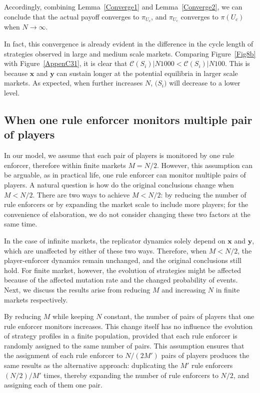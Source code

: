 \documentclass[letterpaper,10pt]{article}
\numberwithin{equation}{section}
\begin{document}
Accordingly, combining Lemma~\ref{Converge1} and Lemma~\ref{Converge2}, we can conclude that the actual payoff converges to $ \pi_{U_{c}} $, and $ \pi_{U_{c}} $ converges to $ \pi(U_c) $ when $ N\to \infty $.

In fact, this convergence is already evident in the difference in the cycle length of strategies observed in large and medium scale markets. Comparing Figure~\ref{Fig8b} with Figure~\ref{AppenC31}, it is clear that $ \mathscr{C}(S_{i})|N1000 < \mathscr{C}(S_{i})|N100 $. This is because $ \mathbf{x} $ and $ \mathbf{y} $ can sustain longer at the potential equilibria in larger scale markets. As expected, when further increases $ N $, $ \mathscr(S_{i}) $ will decrease to a lower level.

\pagebreak
\subsection{When one rule enforcer monitors multiple pair of players}\label{AppendixC7}

In our model, we assume that each pair of players is monitored by one rule enforcer, therefore within finite markets $ M = N/2 $. However, this assumption can be arguable, as in practical life, one rule enforcer can monitor multiple pairs of players. A natural question is how do the original conclusions change when $ M < N/2 $. There are two ways to achieve $ M < N/2 $: by reducing the number of rule enforcers or by expanding the market scale to include more players; for the convenience of elaboration, we do not consider changing these two factors at the same time.

In the case of infinite markets, the replicator dynamics solely depend on $ \mathbf{x} $ and $ \mathbf{y} $, which are unaffected by either of these two ways. Therefore, when $ M < N/2 $, the player-enforcer dynamics remain unchanged, and the original conclusions still hold. For finite market, however, the evolution of strategies might be affected because of the affected mutation rate and the changed probability of events. Next, we discuss the results arise from reducing $ M $ and increasing $ N $ in finite markets respectively.

By reducing $ M $ while keeping $ N $ constant, the number of pairs of players that one rule enforcer monitors increases. This change itself has no influence the evolution of strategy profiles in a finite population, provided that each rule enforcer is randomly assigned to the same number of pairs. This assumption ensures that the assignment of each rule enforcer to $ N/(2M') $ pairs of players produces the same results as the alternative approach: duplicating the $ M' $ rule enforcers $ (N/2)/M' $ times, thereby expanding the number of rule enforcers to $ N/2 $, and assigning each of them one pair.
\end{document}
